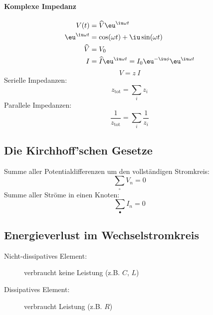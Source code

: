 		\paragraph{Komplexe Impedanz} %
			\begin{align*}
				V(t) &= \widehat V \eu^{\iu \omega t} \\
				\eu^{\iu \omega t} &= \cos(\omega t) + \iu \sin (\omega t) \\
				\widehat V &= V_0 \\
				I &= \widehat I \eu^{\iu \omega t} = I_0 \eu^{-\iu \phi}\eu^{\iu \omega t}
			\end{align*}
			\begin{equation*}
				V = z\:I
			\end{equation*}
			Serielle Impedanzen:
			\begin{equation*}
				z_{\text{tot}} = \sum_i z_i
			\end{equation*}
			Parallele Impedanzen:
			\begin{equation*}
				\frac{1}{z_{\text{tot}}} = \sum_i \frac{1}{z_i}
			\end{equation*}
	\subsection{Die Kirchhoff'schen Gesetze} %
		Summe aller Potentialdifferenzen um den vollständigen Stromkreis:
		\begin{equation*}
			\sum_\circ V_n = 0
		\end{equation*}
		Summe aller Ströme in einen Knoten:
		\begin{equation*}
			\sum_\bullet I_n = 0
		\end{equation*}
	\subsection{Energieverlust im Wechselstromkreis} %
		\begin{description}
			\item[Nicht-dissipatives Element:] verbraucht keine Leistung (z.B. $C$, $L$)
			\item[Dissipatives Element:] verbraucht Leistung (z.B. $R$)
		\end{description}
		
